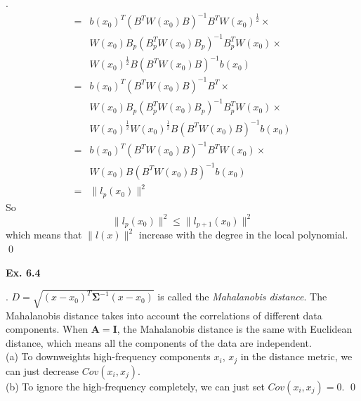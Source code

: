 \documentclass[12pt]{article}
\newenvironment{sol}
  {\par\vspace{3mm}\noindent{\it Solution}.}
  {\qed}
\begin{document}
\begin{sol}
\begin{equation*}
\begin{split}
=&b(x_0)^T(B^TW(x_0)B)^{-1}B^TW(x_0)^{\frac{1}{2}}\times\\
&W(x_0)B_p(B_p^TW(x_0)B_p)^{-1}B_p^TW(x_0)\times\\
&W(x_0)^{\frac{1}{2}}B(B^TW(x_0)B)^{-1}b(x_0)\\
=&b(x_0)^T(B^TW(x_0)B)^{-1}B^T\times\\
&W(x_0)B_p(B_p^TW(x_0)B_p)^{-1}B_p^TW(x_0)\times\\
&W(x_0)^{\frac{1}{2}}W(x_0)^{\frac{1}{2}}B(B^TW(x_0)B)^{-1}b(x_0)\\
=&b(x_0)^T(B^TW(x_0)B)^{-1}B^TW(x_0)\times\\
&W(x_0)B(B^TW(x_0)B)^{-1}b(x_0)\\
=&\parallel l_p(x_0)\parallel^2
\end{split}
\end{equation*}
So
$$\parallel l_p(x_0)\parallel^2\leq\parallel l_{p+1}(x_0)\parallel^2$$
which means that $\parallel l(x)\parallel^2$ increase with the degree in the local polynomial.
\end{sol}

\begin{flushleft}
\textbf{Ex. 6.4}
\end{flushleft}
\begin{sol}
$D=\sqrt{(x-x_0)^T\mathbf{\Sigma}^{-1}(x-x_0)}$ is called the \textit{Mahalanobis distance}. The Mahalanobis distance takes into account
the correlations of different data components. When $\mathbf{A} = \mathbf{I}$, the Mahalanobis distance is the same with
Euclidean distance, which means all the components of the data are independent.\\
(a) To downweights high-frequency components $x_i$, $x_j$ in the distance metric, we can just decrease $Cov(x_i,x_j)$.\\
(b) To ignore the high-frequency completely, we can just set $Cov(x_i,x_j)=0$.
\end{sol}
\end{document}
